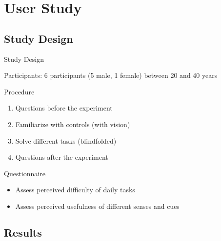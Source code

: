 \documentclass{beamer}
\begin{document}
\section{User Study}

\subsection{Study Design}

\begin{frame}{Study Design}

\alert{Participants:} 6 participants (5 male, 1 female) between 20
and 40 years
\begin{block}{Procedure}
\begin{enumerate}
  	\item Questions before the experiment
  	\item Familiarize with controls (with vision)
  	\item Solve different tasks (blindfolded)
  	\item Questions after the experiment 
  \end{enumerate}
\end{block}

\begin{block}{Questionnaire}
\begin{itemize}
  	\item Assess perceived difficulty of daily tasks
  	\item Assess perceived usefulness of different senses and cues 
  \end{itemize}
\end{block}

\end{frame}

\subsection{Results}
\end{document}
